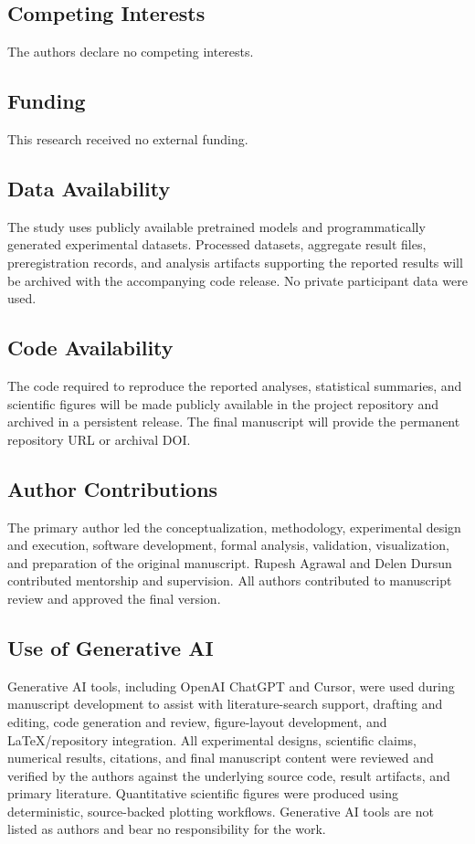 \documentclass[pdflatex,sn-mathphys-ay]{sn-jnl}
\begin{document}
\subsection*{Competing Interests}
The authors declare no competing interests.

\subsection*{Funding}
This research received no external funding.

\subsection*{Data Availability}
The study uses publicly available pretrained models and programmatically generated experimental datasets. Processed datasets, aggregate result files, preregistration records, and analysis artifacts supporting the reported results will be archived with the accompanying code release. No private participant data were used.

\subsection*{Code Availability}
The code required to reproduce the reported analyses, statistical summaries, and scientific figures will be made publicly available in the project repository and archived in a persistent release. The final manuscript will provide the permanent repository URL or archival DOI.

\subsection*{Author Contributions}
The primary author led the conceptualization, methodology, experimental design and execution, software development, formal analysis, validation, visualization, and preparation of the original manuscript. Rupesh Agrawal and Delen Dursun contributed mentorship and supervision. All authors contributed to manuscript review and approved the final version.

\subsection*{Use of Generative AI}
Generative AI tools, including OpenAI ChatGPT and Cursor, were used during manuscript development to assist with literature-search support, drafting and editing, code generation and review, figure-layout development, and LaTeX/repository integration. All experimental designs, scientific claims, numerical results, citations, and final manuscript content were reviewed and verified by the authors against the underlying source code, result artifacts, and primary literature. Quantitative scientific figures were produced using deterministic, source-backed plotting workflows. Generative AI tools are not listed as authors and bear no responsibility for the work.


\end{document}
